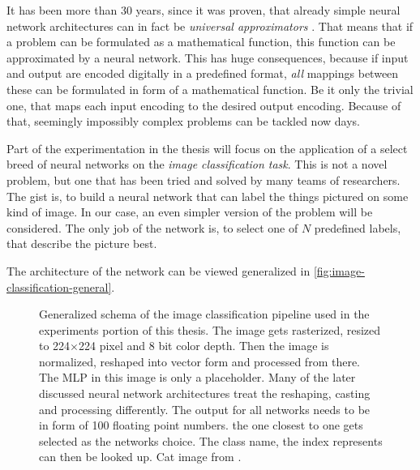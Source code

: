 It has been more than 30 years, since it was proven, that already simple neural network architectures can in fact be \emph{universal approximators} \cite*{ffnUnversalApproximator}. 
That means that if a problem can be formulated as a mathematical function, this function can be approximated by a neural network.
This has huge consequences, because if input and output are encoded digitally in a predefined format, \emph{all} mappings between these can be formulated in form of a mathematical function. 
Be it only the trivial one, that maps each input encoding to the desired output encoding.
Because of that, seemingly impossibly complex problems can be tackled now days. 

Part of the experimentation in the thesis will focus on the application of a select breed of neural networks on the \emph{image classification task}.
This is not a novel problem, but one that has been tried and solved by many teams of researchers. 
The gist is, to build a neural network that can label the things pictured on some kind of image.
In our case, an even simpler version of the problem will be considered. 
The only job of the network is, to select one of $N$ predefined labels, that describe the picture best.

The architecture of the network can be viewed generalized in \autoref{fig:image-classification-general}.

\begin{figure}[htbp]
    \centering
    \caption{Generalized schema of the image classification pipeline used in the experiments portion of this thesis.
        The image gets rasterized, resized to 224$\times$224 pixel and 8 bit color depth. Then the image is normalized, reshaped into vector form and processed from there. The MLP in this image is only a placeholder. Many of the later discussed neural network architectures treat the reshaping, casting and processing differently. The output for all networks needs to be in form of 100 floating point numbers. the one closest to one gets selected as the networks choice. The class name, the index represents can then be looked up.
        Cat image from \cite{catPhoto}.
    }
    \label{fig:image-classification-general}
\end{figure}

